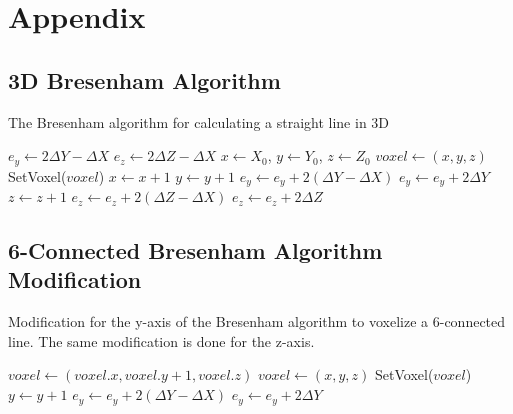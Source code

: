 \chapter{Appendix}\label{cha:appendix}

\section{3D Bresenham Algorithm}\label{app:3dbresen}
\begin{algorithm}[H]
  \caption{The Bresenham algorithm for calculating a straight line in 3D}
  \SetAlgoLined
  \DontPrintSemicolon
  $e_y \leftarrow 2 \Delta Y - \Delta X$\;
  $e_z \leftarrow 2 \Delta Z - \Delta X$\;
  $x \leftarrow X_0$, $y \leftarrow Y_0$, $z \leftarrow Z_0$\;
  {
    $voxel \leftarrow (x,y,z)$\;
    SetVoxel($voxel$)\;
    $x \leftarrow x + 1$\;
    {
      $y \leftarrow y + 1$\;
      $e_y \leftarrow e_y + 2(\Delta Y - \Delta X)$\;
    }
    {
      $e_y \leftarrow e_y + 2\Delta Y$\;
    }
    {
      $z \leftarrow z + 1$\;
      $e_z \leftarrow e_z + 2(\Delta Z - \Delta X)$\;
    }
    {
      $e_z \leftarrow e_z + 2\Delta Z$\;
    }
  }
\end{algorithm}

\newpage

\section{6-Connected Bresenham Algorithm Modification}\label{app:3dbresen-4}
\begin{algorithm}[H]
  \caption{Modification for the y-axis of the Bresenham algorithm to voxelize a 6-connected line. The same modification is done for the z-axis.}
  \SetAlgoLined
  \DontPrintSemicolon
  {
    {
      $voxel \leftarrow (voxel.x, voxel.y+1, voxel.z)$\;
    }
    {
      $voxel \leftarrow (x,y,z)$\;
    }
    SetVoxel($voxel$)\;
    $y \leftarrow y + 1$\;
    $e_y \leftarrow e_y + 2(\Delta Y - \Delta X)$\;
  }
  {
    $e_y \leftarrow e_y + 2\Delta Y$\;
  }
\end{algorithm}

\newpage

